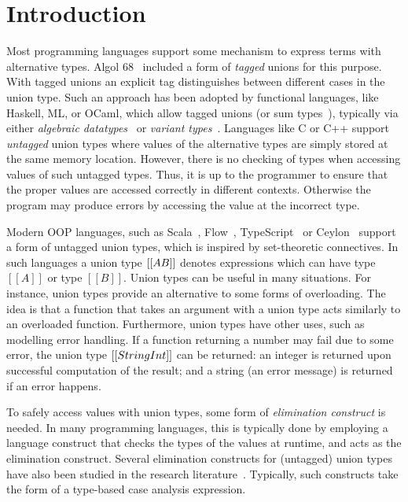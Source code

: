 \section{Introduction}
\label{sec:intro}

Most programming languages support some mechanism to express terms
with alternative types. Algol 68~\cite{} included a form of
\emph{tagged} unions for this purpose. With tagged unions
an explicit tag distinguishes between different cases in the
union type.
Such an approach has been adopted by functional languages, like Haskell, ML, or
OCaml, which allow tagged unions (or sum types~\cite{}), typically via
either \emph{algebraic datatypes}~\cite{} or \emph{variant types}~\cite{}.
Languages like C or C++ support \emph{untagged} union types where
values of the alternative types are simply stored at the same memory
location. However, there is no checking of types when accessing values of
such untagged types. Thus, it is up to the programmer to ensure that the proper
values are accessed correctly in different contexts. Otherwise the
program may produce errors by accessing the value at the incorrect type.

Modern OOP languages, such as Scala~\cite{}, Flow~\cite{},
TypeScript~\cite{} or Ceylon~\cite{} support a form
of untagged union types, which is inspired by set-theoretic connectives.
In such languages a union type $[[A \/ B]]$ denotes expressions which can have type
$[[A]]$ or type $[[B]]$. Union types can be useful in many situations.
For instance, union types provide an alternative to some forms
of overloading. The idea is that a function that takes an argument
with a union type acts similarly to an overloaded function.
Furthermore, union types have other uses, such as modelling error handling.
If a function returning a number may fail due to some
error, the union type $[[String \/ Int]]$ can be returned: an integer
is returned upon successful computation of the result; and
a string (an error message) is returned if an error happens.

To safely access values with union types, some form of
\emph{elimination construct} is needed. In many programming languages,
this is typically done by employing a language construct that checks
the types of the values at runtime, and acts as the elimination
construct. Several elimination constructs for (untagged) union types
have also been studied in the research literature~\cite{}. Typically,
such constructs take the form of a type-based case analysis
expression.

